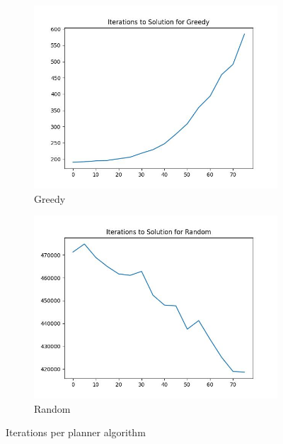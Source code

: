 \documentclass{article}
\begin{document}
\begin{figure}[H]
\begin{subfigure}{0.325\textwidth}
        \includegraphics[width = \textwidth]{plots/Greedy_iterations.jpg}
        \caption{Greedy}
    \end{subfigure}
    \begin{subfigure}{0.325\textwidth}
        \centering
        \includegraphics[width = \textwidth]{plots/Random_iterations.jpg}
        \caption{Random}
    \end{subfigure}
    \caption{Iterations per planner algorithm}
    \label{fig:iterations-per-planner}
\end{figure}
\end{document}
